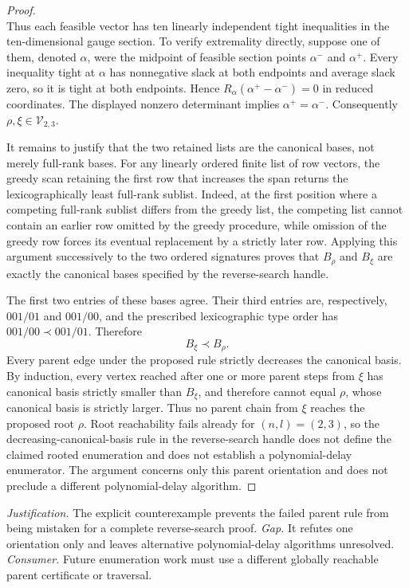 \documentclass{article}
\begin{document}
\begin{proof}
\[\]
Thus each feasible vector has ten linearly independent tight inequalities in the ten-dimensional gauge section. To verify extremality directly, suppose one of them, denoted \(\alpha\), were the midpoint of feasible section points \(\alpha^-\) and \(\alpha^+\). Every inequality tight at \(\alpha\) has nonnegative slack at both endpoints and average slack zero, so it is tight at both endpoints. Hence \(R_{\alpha}(\alpha^+-\alpha^-)=0\) in reduced coordinates. The displayed nonzero determinant implies \(\alpha^+=\alpha^-\). Consequently \(\rho,\xi\in\mathcal V_{2,3}\).

It remains to justify that the two retained lists are the canonical bases, not merely full-rank bases. For any linearly ordered finite list of row vectors, the greedy scan retaining the first row that increases the span returns the lexicographically least full-rank sublist. Indeed, at the first position where a competing full-rank sublist differs from the greedy list, the competing list cannot contain an earlier row omitted by the greedy procedure, while omission of the greedy row forces its eventual replacement by a strictly later row. Applying this argument successively to the two ordered signatures proves that \(B_{\rho}\) and \(B_{\xi}\) are exactly the canonical bases specified by the reverse-search handle.

The first two entries of these bases agree. Their third entries are, respectively, \(001/01\) and \(001/00\), and the prescribed lexicographic type order has \(001/00\prec001/01\). Therefore
\[
B_{\xi}\prec B_{\rho}.
\]
Every parent edge under the proposed rule strictly decreases the canonical basis. By induction, every vertex reached after one or more parent steps from \(\xi\) has canonical basis strictly smaller than \(B_{\xi}\), and therefore cannot equal \(\rho\), whose canonical basis is strictly larger. Thus no parent chain from \(\xi\) reaches the proposed root \(\rho\). Root reachability fails already for \((n,l)=(2,3)\), so the decreasing-canonical-basis rule in the reverse-search handle does not define the claimed rooted enumeration and does not establish a polynomial-delay enumerator. The argument concerns only this parent orientation and does not preclude a different polynomial-delay algorithm.
\end{proof}
\par\smallskip\noindent \textit{Justification.} The explicit counterexample prevents the failed parent rule from being mistaken for a complete reverse-search proof. \textit{Gap.} It refutes one orientation only and leaves alternative polynomial-delay algorithms unresolved. \textit{Consumer.} Future enumeration work must use a different globally reachable parent certificate or traversal.
\end{document}
